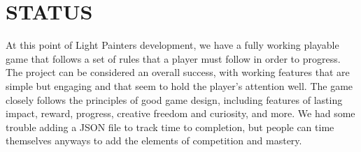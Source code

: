 \documentclass[12pt]{article}
\begin{document}





\section{STATUS}

At this point of Light Painters development, we have a fully working playable game that follows a set of rules that a player must follow in order to progress. The project can be considered an overall success, with working features that are simple but engaging and that seem to hold the player's attention well. The game closely follows the principles of good game design, including features of lasting impact, reward, progress, creative freedom and curiosity, and more. We had some trouble adding a JSON file to track time to completion, but people can time themselves anyways to add the elements of competition and mastery.
\end{document}
